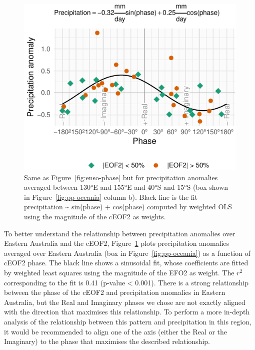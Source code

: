 \documentclass[smallextended]{svjour3}       %
\begin{document}
\begin{figure}
\centering
\includegraphics{../figures/australia-pp-phase-1.pdf}
\caption{\label{fig:australia-pp-phase}Same as Figure~\ref{fig:enso-phase} but for precipitation anomalies averaged between 130°E and 155°E and 40°S and 15°S (box shown in Figure~\ref{fig:pp-oceania} column b).
Black line is the fit precipitation \textasciitilde{} sin(phase) + cos(phase) computed by weighted OLS using the magnitude of the cEOF2 as weights.}
\end{figure}

To better understand the relationship between precipitation anomalies over Eastern Australia and the cEOF2, Figure~\ref{fig:australia-pp-phase} plots precipitation anomalies averaged over Eastern Australia (box in Figure~\ref{fig:pp-oceania}) as a function of cEOF2 phase.
The black line shows a sinusoidal fit, whose coefficients are fitted by weighted least squares using the magnitude of the EFO2 as weight.
The \(r^2\) corresponding to the fit is 0.41 (p-value \textless{} 0.001).
There is a strong relationship between the phase of the cEOF2 and precipitation anomalies in Eastern Australia, but the Real and Imaginary phases we chose are not exactly aligned with the direction that maximises this relationship.
To perform a more in-depth analysis of the relationship between this pattern and precipitation in this region, it would be recommended to align one of the axis (either the Real or the Imaginary) to the phase that maximises the described relationship.
\end{document}
